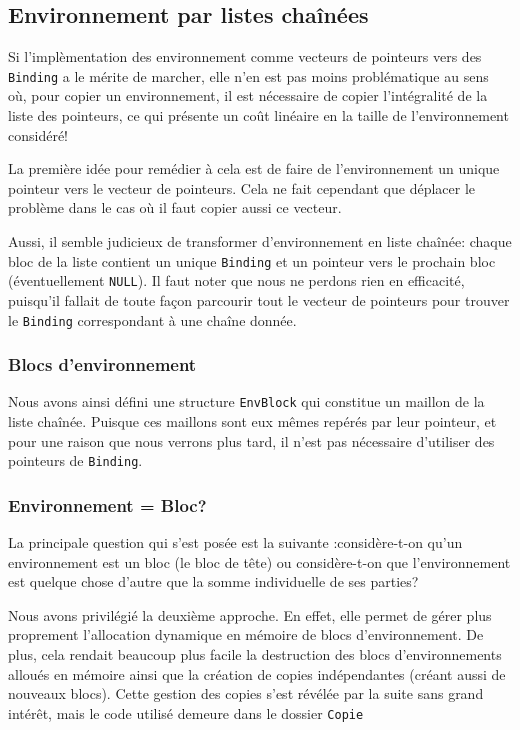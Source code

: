 \documentclass[a4paper,11pt]{article}
\begin{document}
\subsection{Environnement par listes chaînées}

Si l'implèmentation des environnement comme vecteurs 
de pointeurs vers des \texttt{Binding} a le mérite de marcher, elle n'en est
pas moins problématique au sens où, pour copier un environnement, il est
nécessaire de copier l'intégralité de la liste des pointeurs, ce qui présente un
coût linéaire en la taille de l'environnement considéré!

La première idée pour remédier à cela est de faire de l'environnement un unique
pointeur vers le vecteur de pointeurs. Cela ne fait cependant que déplacer le
problème dans le cas où il faut copier aussi ce vecteur.

Aussi, il semble judicieux de transformer d'environnement en liste chaînée:
chaque bloc de la liste contient un unique \texttt{Binding} et un pointeur vers
le prochain bloc (éventuellement \texttt{NULL}). Il faut noter que nous ne perdons rien
en efficacité, puisqu'il fallait de toute façon parcourir tout le vecteur de
pointeurs pour trouver le \texttt{Binding} correspondant à une chaîne donnée.

\subsubsection{Blocs d’environnement}

Nous avons ainsi défini une structure \texttt{EnvBlock} qui constitue un maillon
de la liste chaînée. Puisque ces maillons sont eux mêmes repérés par leur
pointeur, et pour une raison que nous verrons plus tard, il n'est pas nécessaire
d'utiliser des pointeurs de \texttt{Binding}.

\subsubsection{Environnement = Bloc?}

La principale question qui s'est posée est la suivante :considère-t-on qu'un
environnement est un bloc (le bloc de \og tête\fg) ou considère-t-on que
l'environnement est quelque chose d'autre que la somme individuelle de ses
parties?

Nous avons privilégié la deuxième approche. En effet, elle permet de gérer plus
proprement l'allocation dynamique en mémoire de blocs d'environnement. De plus,
cela rendait beaucoup plus facile la destruction des blocs d'environnements
alloués en mémoire ainsi que la création de copies indépendantes (créant aussi
de nouveaux blocs). Cette gestion des copies s'est révélée par la suite sans
grand intérêt, mais le code utilisé demeure dans le dossier \texttt{Copie}
\end{document}
